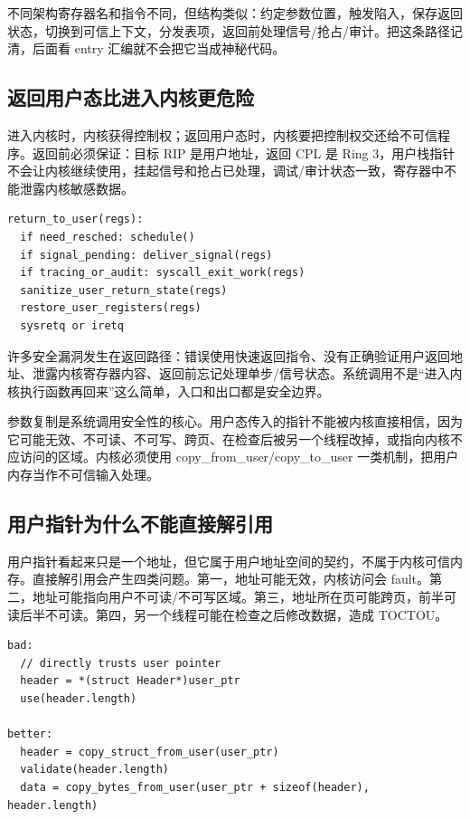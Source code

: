不同架构寄存器名和指令不同，但结构类似：约定参数位置，触发陷入，保存返回状态，切换到可信上下文，分发表项，返回前处理信号/抢占/审计。把这条路径记清，后面看 entry 汇编就不会把它当成神秘代码。

\subsection{返回用户态比进入内核更危险}

进入内核时，内核获得控制权；返回用户态时，内核要把控制权交还给不可信程序。返回前必须保证：目标 RIP 是用户地址，返回 CPL 是 Ring 3，用户栈指针不会让内核继续使用，挂起信号和抢占已处理，调试/审计状态一致，寄存器中不能泄露内核敏感数据。

\begin{lstlisting}
return_to_user(regs):
  if need_resched: schedule()
  if signal_pending: deliver_signal(regs)
  if tracing_or_audit: syscall_exit_work(regs)
  sanitize_user_return_state(regs)
  restore_user_registers(regs)
  sysretq or iretq
\end{lstlisting}

许多安全漏洞发生在返回路径：错误使用快速返回指令、没有正确验证用户返回地址、泄露内核寄存器内容、返回前忘记处理单步/信号状态。系统调用不是“进入内核执行函数再回来”这么简单，入口和出口都是安全边界。

参数复制是系统调用安全性的核心。用户态传入的指针不能被内核直接相信，因为它可能无效、不可读、不可写、跨页、在检查后被另一个线程改掉，或指向内核不应访问的区域。内核必须使用 copy\_from\_user/copy\_to\_user 一类机制，把用户内存当作不可信输入处理。

\subsection{用户指针为什么不能直接解引用}

用户指针看起来只是一个地址，但它属于用户地址空间的契约，不属于内核可信内存。直接解引用会产生四类问题。第一，地址可能无效，内核访问会 fault。第二，地址可能指向用户不可读/不可写区域。第三，地址所在页可能跨页，前半可读后半不可读。第四，另一个线程可能在检查之后修改数据，造成 TOCTOU。

\begin{lstlisting}
bad:
  // directly trusts user pointer
  header = *(struct Header*)user_ptr
  use(header.length)

better:
  header = copy_struct_from_user(user_ptr)
  validate(header.length)
  data = copy_bytes_from_user(user_ptr + sizeof(header), header.length)
\end{lstlisting}

